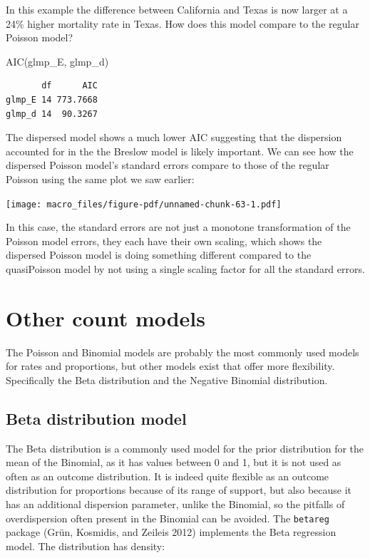 \documentclass[
  letterpaper,
  DIV=11,
  numbers=noendperiod]{scrreprt}
\newenvironment{Shaded}{\begin{snugshade}}{\end{snugshade}}
\newcommand{\FunctionTok}[1]{\textcolor[rgb]{0.28,0.35,0.67}{#1}}
\newcommand{\NormalTok}[1]{\textcolor[rgb]{0.00,0.23,0.31}{#1}}
\begin{document}
In this example the difference between California and Texas is now
larger at a 24\% higher mortality rate in Texas. How does this model
compare to the regular Poisson model?

\begin{Shaded}
\begin{Highlighting}[]
\FunctionTok{AIC}\NormalTok{(glmp\_E, glmp\_d)}
\end{Highlighting}
\end{Shaded}

\begin{verbatim}
       df      AIC
glmp_E 14 773.7668
glmp_d 14  90.3267
\end{verbatim}

The dispersed model shows a much lower AIC suggesting that the
dispersion accounted for in the the Breslow model is likely important.
We can see how the dispersed Poisson model's standard errors compare to
those of the regular Poisson using the same plot we saw earlier:

\texttt{[image: macro\_files/figure-pdf/unnamed-chunk-63-1.pdf]}

In this case, the standard errors are not just a monotone transformation
of the Poisson model errors, they each have their own scaling, which
shows the dispersed Poisson model is doing something different compared
to the quasiPoisson model by not using a single scaling factor for all
the standard errors.

\hypertarget{other-count-models}{%
\section{Other count models}\label{other-count-models}}

The Poisson and Binomial models are probably the most commonly used
models for rates and proportions, but other models exist that offer more
flexibility. Specifically the Beta distribution and the Negative
Binomial distribution.

\hypertarget{beta-distribution-model}{%
\subsection{Beta distribution model}\label{beta-distribution-model}}

The Beta distribution is a commonly used model for the prior
distribution for the mean of the Binomial, as it has values between 0
and 1, but it is not used as often as an outcome distribution. It is
indeed quite flexible as an outcome distribution for proportions because
of its range of support, but also because it has an additional
dispersion parameter, unlike the Binomial, so the pitfalls of
overdispersion often present in the Binomial can be avoided. The
\texttt{betareg} package (Grün, Kosmidis, and Zeileis 2012) implements
the Beta regression model. The distribution has density:
\end{document}
